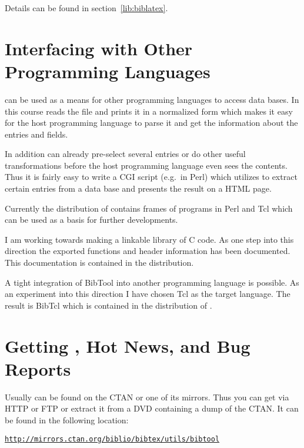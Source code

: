 \documentclass[11pt,a4paper]{scrbook}
\makeatletter
\newcommand\Link[2]{\href{#1}{\texttt{#2}}}
\let\BIBTEX\BibTeX
\renewcommand\BibTeX{\BIBTEX\index{bibtex@\BIBTEX}}
\makeatother
\begin{document}
Details can be found in section~\ref{lib:biblatex}.

\section{Interfacing \BibTool{} with Other Programming Languages}

\BibTool{} can be used as a means for other programming languages to access
\BibTeX{} data bases. In this course \BibTool{} reads the \BibTeX{} file and
prints it in a normalized form which makes it easy for the host programming
language to parse it and get the information about the entries and fields.

In addition \BibTool{} can already pre-select several entries or do other
useful transformations before the host programming language even sees the
contents.  Thus it is fairly easy to write a CGI script (e.g.\ in Perl) which
utilizes \BibTool{} to extract certain entries from a \BibTeX{} data base and
presents the result on a HTML page.

Currently the distribution of \BibTool{} contains frames of programs in Perl
and Tcl which can be used as a basis for further developments.

I am working towards making \BibTool{} a linkable library of C code. As one
step into this direction the exported functions and header information has
been documented. This documentation is contained in the distribution.

A tight integration of BibTool into another programming language is possible.
As an experiment into this direction I have chosen Tcl as the target language.
The result is BibTcl which is contained in the distribution of \BibTool.


\section{Getting \BibTool, Hot News, and Bug Reports}

Usually \BibTool{} can be found on the CTAN or one of its mirrors. Thus you
can get \BibTool{} via HTTP or FTP or extract it from a DVD containing a dump
of the CTAN. It can be found in the following location:
\begin{list}{}{}
\item \Link{http://mirrors.ctan.org/biblio/bibtex/utils/bibtool}%
  {http://mirrors.ctan.org/biblio/bibtex/utils/bibtool}
\end{list}
\end{document}
